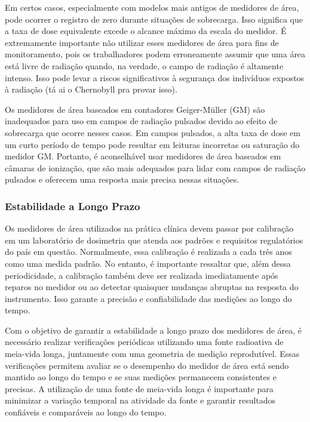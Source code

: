 \documentclass[11pt,a4paper]{article}
\begin{document}
	Em certos casos, especialmente com modelos mais antigos de medidores de área, pode ocorrer o registro de zero durante situações de sobrecarga. Isso significa que a taxa de dose equivalente excede o alcance máximo da escala do medidor. É extremamente importante não utilizar esses medidores de área para fins de monitoramento, pois os trabalhadores podem erroneamente assumir que uma área está livre de radiação quando, na verdade, o campo de radiação é altamente intenso. Isso pode levar a riscos significativos à segurança dos indivíduos expostos à radiação (tá ai o Chernobyll pra provar isso).

	Os medidores de área baseados em contadores Geiger-Müller (GM) são inadequados para uso em campos de radiação pulsados devido ao efeito de sobrecarga que ocorre nesses casos. Em campos pulsados, a alta taxa de dose em um curto período de tempo pode resultar em leituras incorretas ou saturação do medidor GM. Portanto, é aconselhável usar medidores de área baseados em câmaras de ionização, que são mais adequados para lidar com campos de radiação pulsados e oferecem uma resposta mais precisa nessas situações.

\subsubsection*{Estabilidade a Longo Prazo}

	Os medidores de área utilizados na prática clínica devem passar por calibração em um laboratório de dosimetria que atenda aos padrões e requisitos regulatórios do país em questão. Normalmente, essa calibração é realizada a cada três anos como uma medida padrão. No entanto, é importante ressaltar que, além dessa periodicidade, a calibração também deve ser realizada imediatamente após reparos no medidor ou ao detectar quaisquer mudanças abruptas na resposta do instrumento. Isso garante a precisão e confiabilidade das medições ao longo do tempo.

	Com o objetivo de garantir a estabilidade a longo prazo dos medidores de área, é necessário realizar verificações periódicas utilizando uma fonte radioativa de meia-vida longa, juntamente com uma geometria de medição reprodutível. Essas verificações permitem avaliar se o desempenho do medidor de área está sendo mantido ao longo do tempo e se suas medições permanecem consistentes e precisas. A utilização de uma fonte de meia-vida longa é importante para minimizar a variação temporal na atividade da fonte e garantir resultados confiáveis e comparáveis ao longo do tempo.
\end{document}
